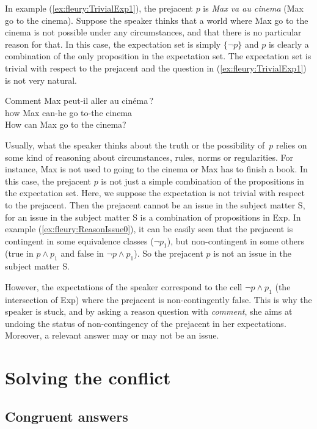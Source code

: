 \documentclass[output=paper,colorlinks,citecolor=brown,
]{langscibook}
\begin{document}
In  example (\ref{ex:fleury:TrivialExp1}), the prejacent $p$ is \textit{Max va au cinema} (Max go to the cinema). Suppose the speaker thinks that a world where Max go to the cinema is not possible under any circumstances, and that there is no particular reason for that. 
In this case, the expectation set is simply $\{\neg p\}$ and $p$ is clearly a combination of the only proposition in the expectation set. 
The expectation set is trivial with respect to the prejacent and the question in (\ref{ex:fleury:TrivialExp1}) is not very natural.
\begin{exe}
\ex\label{ex:fleury:TrivialExp1} \gll Comment Max peut-il aller au cin\'ema\,?\\
how Max can-he go to-the cinema\\
\glt How can Max go to the cinema?
\end{exe}
Usually, what the speaker thinks about the truth or the possibility of~$p$ relies on some kind of reasoning about circumstances, rules, norms or regularities. For instance, Max is not used to going to the cinema or Max has to finish a book. In this case, the prejacent $p$ is not just a simple combination of the propositions in the expectation set.
Here, we suppose the expectation is not trivial with respect to the prejacent.
Then the prejacent cannot be an {issue} in the subject matter S,
for an issue in the subject matter S is a combination of propositions in Exp.
In example (\ref{ex:fleury:ReasonIssue0}), it can be easily seen that the prejacent is contingent in some equivalence classes ($\neg p_1$), but non-contingent in some others (true in $p \land p_1$ and false in $\neg p \land p_1$). 
So the prejacent $p$ is not an issue in the subject matter S.

However, the expectations
of the speaker correspond to the cell $\neg p \land p_1$ (the intersection of Exp) where 
{the prejacent is non-contingently false}.
 This is why the speaker is stuck, and by asking a reason question with \textit{comment}, she aims at
undoing the status of non-contingency of the prejacent
in her expectations. Moreover, a relevant answer may or may not be an issue.


\section{Solving the conflict }\label{sec:fleury:spareBits}

\subsection{Congruent answers}\label{sec:fleury:conguent}
\end{document}
